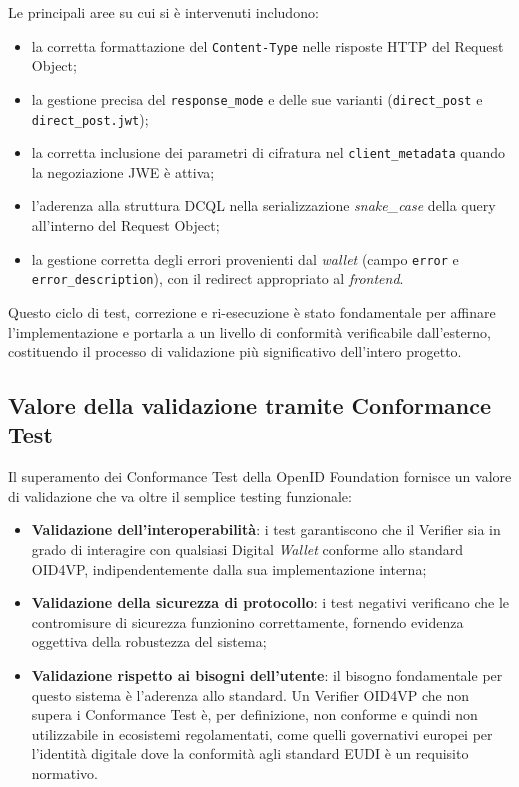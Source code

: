Le principali aree su cui si è intervenuti includono:

\begin{itemize}
    \item la corretta formattazione del \texttt{Content-\allowbreak{}Type} nelle risposte HTTP del Request Object;
    \item la gestione precisa del \texttt{response\_\allowbreak{}mode} e delle sue varianti (\texttt{direct\_\allowbreak{}post} e \texttt{direct\_\allowbreak{}post.jwt});
    \item la corretta inclusione dei parametri di cifratura nel \texttt{client\_\allowbreak{}metadata} quando la negoziazione JWE è attiva;
    \item l'aderenza alla struttura DCQL nella serializzazione \textit{snake\_case} della query all'interno del Request Object;
    \item la gestione corretta degli errori provenienti dal \textit{wallet} (campo \texttt{error} e \texttt{error\_\allowbreak{}description}), con il redirect appropriato al \textit{frontend}.
\end{itemize}
Questo ciclo di test, correzione e ri-esecuzione è stato fondamentale per affinare l'implementazione e portarla a un livello di conformità verificabile dall'esterno, costituendo il processo di validazione più significativo dell'intero progetto.

\subsection{Valore della validazione tramite Conformance Test}
Il superamento dei Conformance Test della OpenID Foundation fornisce un valore di validazione che va oltre il semplice testing funzionale:

\begin{itemize}
    \item \textbf{Validazione dell'interoperabilità}: i test garantiscono che il Verifier sia in grado di interagire con qualsiasi Digital \textit{Wallet} conforme allo standard OID4VP, indipendentemente dalla sua implementazione interna;
    \item \textbf{Validazione della sicurezza di protocollo}: i test negativi verificano che le contromisure di sicurezza funzionino correttamente, fornendo evidenza oggettiva della robustezza del sistema;
    \item \textbf{Validazione rispetto ai bisogni dell'utente}: il bisogno fondamentale per questo sistema è l'aderenza allo standard. Un Verifier OID4VP che non supera i Conformance Test è, per definizione, non conforme e quindi non utilizzabile in ecosistemi regolamentati, come quelli governativi europei per l'identità digitale dove la conformità agli standard EUDI è un requisito normativo.
\end{itemize}
